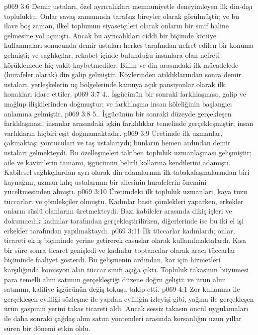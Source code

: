 \vs p069 3:6 Demir ustaları, özel ayrıcalıkları memnuniyetle deneyimleyen ilk din\hyp{}dışı topluluktu. Onlar savaş zamanında tarafsız bireyler olarak görülmüştü; ve bu ilave boş zaman, ilkel toplumun siyasetçileri olarak onların bir sınıf haline gelmesine yol açmıştı. Ancak bu ayrıcalıkları ciddi bir biçimde kötüye kullanmaları sonucunda demir ustaları herkes tarafından nefret edilen bir konuma gelmişti; ve sağlıkçılar, rekabet içinde bulunduğu insanlara olan nefreti körüklemede hiç vakit kaybetmediler. Bilim ve din arasındaki ilk mücadelede (hurafeler olarak) din galip gelmiştir. Köylerinden atıldıklarından sonra demir ustaları, yerleşkelerin uç bölgelerinde kamuya açık pansiyonlar olarak ilk konakları idare ettiler.
\vs p069 3:7 4.\bibnobreakspace {}. İşgücünün bir sonraki farklılaşması, galip ve mağlup ilişkilerinden doğmuştur; ve farklılaşma insan köleliğinin başlangıcı anlamına gelmiştir.
\vs p069 3:8 5.\bibnobreakspace {}. İşgücünün bir sonraki düzeyde gerçekleşen farklılaşması, insanlar arasındaki içkin farklılıklar temelinde gerçekleşmiştir; insan varlıkların hiçbiri eşit doğmamaktadır.
\vs p069 3:9 Üretimde ilk uzmanlar, çakmaktaşı yontucuları ve taş ustalarıydı; bunların hemen ardından demir ustaları gelmekteydi. Bu özelleşmeleri takiben topluluk uzmanlaşması gelişmiştir; aile ve kavimlerin tamamı, işgücünün belirli kollarına kendilerini adamıştı. Kabilesel sağlıkçılardan ayrı olarak din adamlarının ilk tabakalaşmalarından biri kaynağını, uzman kılıç ustalarının bir ailesinin hurafelerin önemini yüceltmesinden almıştı.
\vs p069 3:10 Üretimdeki ilk topluluk uzmanları, kaya tuzu tüccarları ve çömlekçiler olmuştu. Kadınlar basit çömlekleri yaparken, erkekler onların süslü olanlarını üretmekteydi. Bazı kabileler arasında dikiş işleri ve dokumacılık kadınlar tarafından gerçekleştirilirken, diğerlerinde ise bu iki el işi erkekler tarafından yapılmaktaydı.
\vs p069 3:11 İlk tüccarlar kadınlardı; onlar, ticareti ek iş biçiminde yerine getirerek casuslar olarak kullanılmaktalardı. Kısa bir süre sonra ticaret genişledi ve kadınlar toptancılar olarak aracı tüccarlar biçiminde faaliyet gösterdi. Bu gelişmenin ardından, kar için hizmetleri karşılığında komisyon alan tüccar sınıfı açığa çıktı. Topluluk takasının büyümesi para temelli alım satımın gerçekleştiği düzene doğru gelişti; ve ürün alım satımını, kalifiye işgücünün değiş tokuşu takip etti.
\vs p069 4:1 Zor kullanma ile gerçekleşen evliliği sözleşme ile yapılan evliliğin izleyişi gibi, yağma ile gerçekleşen ürün gaspının yerini takas ticareti aldı. Ancak sessiz takasın öncül uygulamaları ile daha sonraki çağdaş alım satım yöntemleri arasında korsanlığın uzun yıllar süren bir dönemi etkin oldu.
